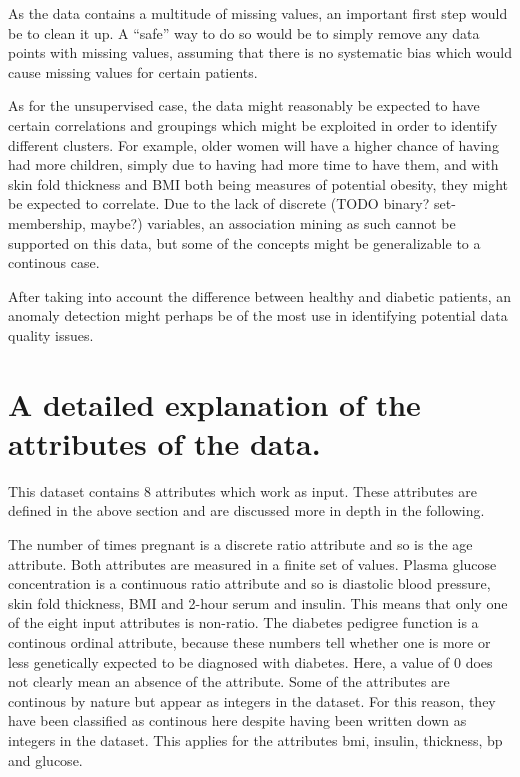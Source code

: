 As the data contains a multitude of missing values,
an important first step would be to clean it up.
A ``safe'' way to do so would be to simply remove any data points
with missing values,
assuming that there is no systematic bias
which would cause missing values for certain patients.

As for the unsupervised case,
the data might reasonably be expected to have certain correlations
and groupings
which might be exploited
in order to identify different clusters.
For example, older women will have a higher chance of having had more children,
simply due to having had more time to have them,
and with skin fold thickness and BMI both being measures of potential obesity,
they might be expected to correlate.
Due to the lack of discrete (TODO binary? set-membership, maybe?) variables,
an association mining as such cannot be supported on this data,
but some of the concepts might be generalizable to a continous case.

After taking into account the difference between healthy and diabetic patients,
an anomaly detection might perhaps be of the most use in identifying
potential data quality issues.

\section{A detailed explanation of the attributes of the data.}

This dataset contains 8 attributes which work as input. These attributes are defined in
the above section and are discussed more in depth in the following.

The number of times pregnant is a discrete ratio attribute and so is
the age attribute. Both attributes are measured in a finite set of values.
Plasma glucose concentration is a continuous ratio attribute
and so is diastolic blood pressure, skin fold thickness, BMI and 2-hour serum and
insulin. This means that only one of the eight input attributes is non-ratio.
The diabetes pedigree function is a continous ordinal attribute, because these
numbers tell whether one is more or less genetically expected to be diagnosed
with diabetes. Here, a value of 0 does not clearly mean an absence of the attribute.
Some of the attributes are continous by nature but appear as integers in the dataset.
For this reason, they have been classified as continous here despite having been written
down as integers in the dataset. This applies for the attributes bmi, insulin,
thickness, bp and glucose.
\bigskip

